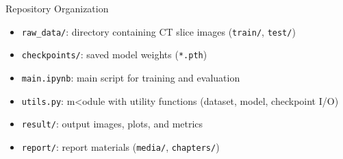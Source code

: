 

\begin{frame}{Repository Organization}
  \begin{itemize}
    \item \texttt{raw\_data/}: directory containing CT slice images (\texttt{train/}, \texttt{test/})
    \item \texttt{checkpoints/}: saved model weights (\texttt{*.pth})
    \item \texttt{main.ipynb}: main script for training and evaluation
    \item \texttt{utils.py}: m<odule with utility functions (dataset, model, checkpoint I/O)
    \item \texttt{result/}: output images, plots, and metrics
    \item \texttt{report/}: report materials (\texttt{media/}, \texttt{chapters/})
  \end{itemize}
\end{frame}

